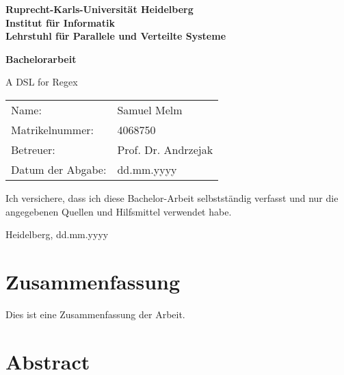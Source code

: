 \documentclass[
     12pt,                    %
     a4paper,             %
     BCOR10mm,     %
     DIV14,                 %
     listof=totoc,                    %
     bibliography=totoc,       %
     index=totoc,              %
     twoside,
     headsepline
     ]{scrreprt}
\begin{document}
\begin{titlepage}


\vspace*{1cm}
\begin{center}
\vspace*{3cm}
\textbf{ 
\Large Ruprecht-Karls-Universität Heidelberg\\
\smallskip
\Large Institut für Informatik\\
\smallskip
\Large Lehrstuhl für Parallele und Verteilte Systeme\\
\smallskip
}

\vspace{3cm}

\textbf{\large Bachelorarbeit}

\vspace{0.5\baselineskip}
{\huge
    A DSL for Regex
}
\end{center}

\vfill 

{\large
\begin{tabular}[l]{ll}
Name: & Samuel Melm\\
Matrikelnummer: & 4068750 \\
Betreuer: & Prof. Dr. Andrzejak\\
Datum der Abgabe: & dd.mm.yyyy
\end{tabular}
}

\end{titlepage}

\onehalfspacing

\thispagestyle{empty}

\vspace*{100pt}
\noindent
Ich versichere, dass ich diese Bachelor-Arbeit selbstständig verfasst und nur die angegebenen
Quellen und Hilfsmittel verwendet habe.

\vspace*{50pt}

\noindent
Heidelberg, dd.mm.yyyy
\cleardoublepage

\section*{Zusammenfassung}

Dies ist eine Zusammenfassung der Arbeit.

\section*{Abstract}
\end{document}
